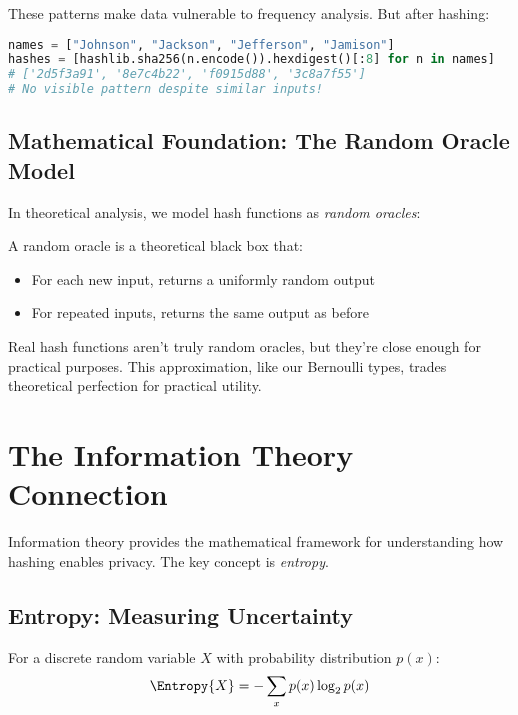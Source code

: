 These patterns make data vulnerable to frequency analysis. But after hashing:

\begin{lstlisting}[language=Python]
names = ["Johnson", "Jackson", "Jefferson", "Jamison"]
hashes = [hashlib.sha256(n.encode()).hexdigest()[:8] for n in names]
# ['2d5f3a91', '8e7c4b22', 'f0915d88', '3c8a7f55']
# No visible pattern despite similar inputs!
\end{lstlisting}

\subsection{Mathematical Foundation: The Random Oracle Model}

In theoretical analysis, we model hash functions as \emph{random oracles}:

\begin{definition}
A random oracle is a theoretical black box that:
\begin{itemize}
    \item For each new input, returns a uniformly random output
    \item For repeated inputs, returns the same output as before
\end{itemize}
\end{definition}

Real hash functions aren't truly random oracles, but they're close enough for practical purposes. This approximation, like our Bernoulli types, trades theoretical perfection for practical utility.

\section{The Information Theory Connection}

Information theory provides the mathematical framework for understanding how hashing enables privacy. The key concept is \emph{entropy}.

\subsection{Entropy: Measuring Uncertainty}

\begin{definition}
For a discrete random variable $X$ with probability distribution $p(x)$:
\[
\Entropy{X} = -\sum_{x} p(x) \log_2 p(x)
\]
\end{definition}

